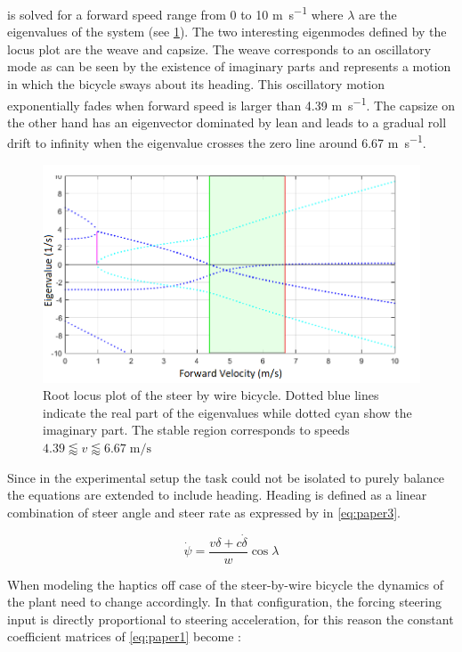 is solved for a forward speed range from 0 to 10 \si{\meter\per\second} where \ensuremath{\lambda} are the eigenvalues of the system (see \cref{fig:paper2}). The two interesting eigenmodes defined by the locus plot are the weave and capsize. The weave corresponds to an oscillatory mode as can be seen by the existence of imaginary parts and represents a motion in which the bicycle sways about its heading. This oscillatory motion exponentially fades when forward speed is larger than 4.39 \si{\meter\per\second}. The capsize on the other hand has an eigenvector dominated by lean and leads to a gradual roll drift to infinity when the eigenvalue crosses the zero line around 6.67 \si{\meter\per\second}.
\begin{figure}[ht]
    \centering
    \captionsetup{justification=centering,margin=2cm}

    \includegraphics[scale=0.6]{images/root_locus_steerbywire.png}
    \caption{Root locus plot of the steer by wire bicycle. Dotted blue lines indicate the real part of the eigenvalues while dotted cyan show the imaginary part. The stable region corresponds to speeds  \ensuremath{4.39\lessapprox v \lessapprox 6.67\; \si{\meter\per\second}}}
    \label{fig:paper2}
\end{figure}
Since in the experimental setup the task could not be isolated to purely balance the equations are extended to include heading. Heading is defined as a linear combination of steer angle and steer rate as expressed by \citet{meijaard2007linearized} in \cref{eq:paper3}. 

\begin{equation}
    \dot{\psi}=\frac{v \delta+c \dot{\delta}}{w} \cos \lambda
    \label{eq:paper3}
    \end{equation}

When modeling the haptics off case of the steer-by-wire bicycle the dynamics of the plant need to change accordingly. In that configuration, the forcing steering input is directly proportional to steering acceleration, for this reason the  constant coefficient matrices of \ref{eq:paper1} become :

